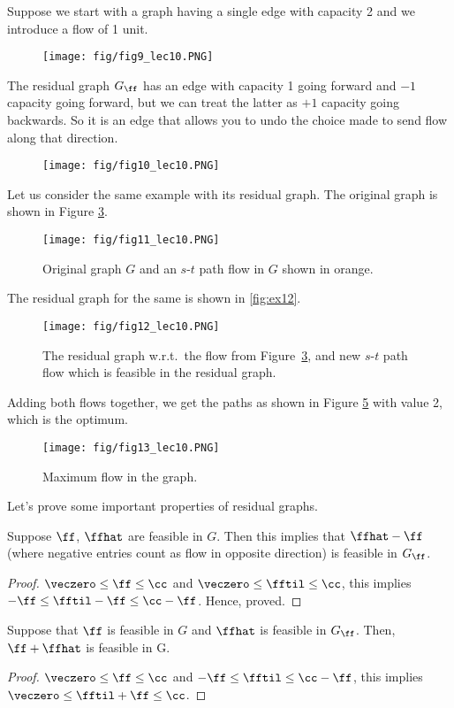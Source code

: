 Suppose we start with a graph having a single edge with capacity 2 and we introduce a flow of 1 unit.
\begin{figure}[H]
 \centering
  \texttt{[image: fig/fig9\_lec10.PNG]}
  \label{fig:ex9}
\end{figure}
The residual graph \(G_{\ff}\) has an edge with capacity 1 going
forward and $-1$ capacity going forward, but we can treat the latter as $+1$
capacity going backwards. So it is an edge that allows you to undo the choice made to send flow along that direction.
\begin{figure}[H]
 \centering
  \texttt{[image: fig/fig10\_lec10.PNG]}
  \label{fig:ex10}
\end{figure}
Let us consider the same example with its residual graph. The original graph is shown in Figure \ref{fig:ex11}.
\begin{figure}[H]
 \centering
  \texttt{[image: fig/fig11\_lec10.PNG]}
  \caption{Original graph $G$ and an $s$-$t$ path flow in $G$ shown in
    orange.}
  \label{fig:ex11}
\end{figure}
The residual graph for the same is shown in \autoref{fig:ex12}.
\begin{figure}[H]
 \centering
  \texttt{[image: fig/fig12\_lec10.PNG]}
  \caption{The residual graph w.r.t.\ the flow from
    Figure~\ref{fig:ex11}, and new $s$-$t$ path flow which is feasible
  in the residual graph.}\label{fig:ex12}
\end{figure}
Adding both flows together, we get the paths as shown in Figure \ref{fig:ex13} with value 2, which is the optimum.
\begin{figure}[H]
 \centering
  \texttt{[image: fig/fig13\_lec10.PNG]}
  \caption{Maximum flow in the graph.}\label{fig:ex13}
\end{figure}
Let's prove some important properties of residual graphs.
\begin{lemma}
    \label{lem:gtogres}
Suppose   \(\ff\), \(\ffhat\) are feasible in $G$. Then this implies that \(\ffhat - \ff\)  (where negative entries count as flow in opposite direction) is feasible in \(G_{\ff}\).
\end{lemma}
\begin{proof}
\(\veczero \leq \ff \leq \cc\) and  \(\veczero \leq \fftil \leq \cc\), this implies \(-\ff \leq \fftil - \ff \leq \cc - \ff \). Hence, proved.
\end{proof}
\begin{lemma}
  \label{lem:grestog}
Suppose that \(\ff\) is feasible in \(G\) and \(\ffhat\) is feasible in \(G_{\ff}\). Then, \(\ff + \ffhat\) is feasible in G.
\end{lemma}
\begin{proof}
\(\veczero \leq \ff \leq \cc\) and  \(- \ff \leq \fftil \leq \cc - \ff \), this implies \(\veczero \leq \fftil + \ff \leq \cc\).
\end{proof}


